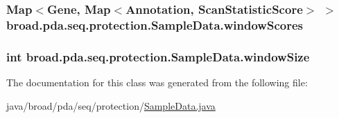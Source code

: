 \hypertarget{classbroad_1_1pda_1_1seq_1_1protection_1_1_sample_data_a6a53d104b93427859b6fd2c4ffbfdf6d}{
\subsubsection[{window\+Scores}]{\setlength{\rightskip}{0pt plus 5cm}Map$<$Gene, Map$<$Annotation, Scan\+Statistic\+Score$>$ $>$ broad.\+pda.\+seq.\+protection.\+Sample\+Data.\+window\+Scores\hspace{0.3cm}{\ttfamily [protected]}}}\label{classbroad_1_1pda_1_1seq_1_1protection_1_1_sample_data_a6a53d104b93427859b6fd2c4ffbfdf6d}
\hypertarget{classbroad_1_1pda_1_1seq_1_1protection_1_1_sample_data_af155a04e70a9feafd812aa6135f5b732}{
\subsubsection[{window\+Size}]{\setlength{\rightskip}{0pt plus 5cm}int broad.\+pda.\+seq.\+protection.\+Sample\+Data.\+window\+Size\hspace{0.3cm}{\ttfamily [protected]}}}\label{classbroad_1_1pda_1_1seq_1_1protection_1_1_sample_data_af155a04e70a9feafd812aa6135f5b732}


The documentation for this class was generated from the following file\+:\begin{DoxyCompactItemize}
\item 
java/broad/pda/seq/protection/\hyperlink{protection_2_sample_data_8java}{Sample\+Data.\+java}\end{DoxyCompactItemize}
